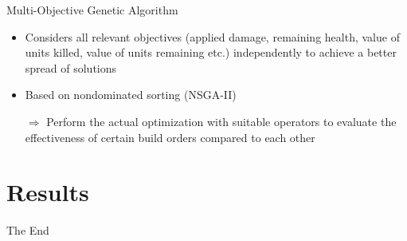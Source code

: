 \documentclass{beamer}
\begin{document}
\begin{frame}{Multi-Objective Genetic Algorithm}
\begin{itemize}
\item Considers all relevant objectives (applied damage, remaining health, value of units killed, value of units remaining etc.) independently to achieve a better spread of solutions
\item Based on \alert{nondominated sorting} (NSGA-II)
\item[$\Rightarrow$] Perform the actual optimization with suitable operators to \alert{evaluate the effectiveness of certain build orders} compared to each other
\end{itemize}
\end{frame}

\section{Results}








%
%
%


\begin{frame}
\Huge{\centerline{The End}}
\end{frame}

\end{document}
